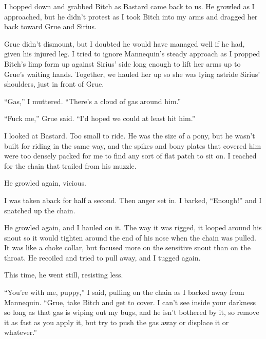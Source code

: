 I hopped down and grabbed Bitch as Bastard came back to us.  He growled as I approached, but he didn't protest as I took Bitch into my arms and dragged her back toward Grue and Sirius.



Grue didn't dismount, but I doubted he would have managed well if he had, given his injured leg.  I tried to ignore Mannequin's steady approach as I propped Bitch's limp form up against Sirius' side long enough to lift her arms up to Grue's waiting hands.  Together, we hauled her up so she was lying astride Sirius' shoulders, just in front of Grue.



``Gas,'' I muttered.  ``There's a cloud of gas around him.''



``Fuck me,'' Grue said.  ``I'd hoped we could at least hit him.''



I looked at Bastard.  Too small to ride.  He was the size of a pony, but he wasn't built for riding in the same way, and the spikes and bony plates that covered him were too densely packed for me to find any sort of flat patch to sit on.  I reached for the chain that trailed from his muzzle.



He growled again, vicious.



I was taken aback for half a second.  Then anger set in.  I barked, ``Enough!'' and I snatched up the chain.



He growled again, and I hauled on it.  The way it was rigged, it looped around his snout so it would tighten around the end of his nose when the chain was pulled.  It was like a choke collar, but focused more on the sensitive snout than on the throat.  He recoiled and tried to pull away, and I tugged again.



This time, he went still, resisting less.



``You're with me, puppy,'' I said, pulling on the chain as I backed away from Mannequin.  ``Grue, take Bitch and get to cover.  I can't see inside your darkness so long as that gas is wiping out my bugs, and he isn't bothered by it, so remove it as fast as you apply it, but try to push the gas away or displace it or whatever.''



